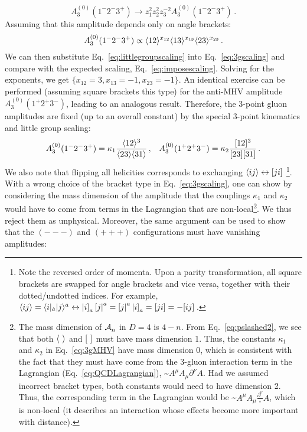 \documentclass[main.tex]{subfiles}
\begin{document}
\begin{equation} \label{eq:imposescaling}
    A_3^{(0)} (1^-2^-3^+) \rightarrow z_1^2 z_2^2 z_3^{-2} A_3^{(0)}(1^-2^-3^+) \,.
\end{equation}
Assuming that this amplitude depends only on angle brackets:
\begin{equation} \label{eq:3gscaling}
    A_3^{(0)} (1^-2^-3^+) \propto \langle 12 \rangle^{x_{12}} \langle 13 \rangle^{x_{13}} \langle 23 \rangle^{x_{23}} \,.
\end{equation}
We can then substitute Eq.~\ref{eq:littlegroupscaling} into Eq.~\ref{eq:3gscaling} and compare with the expected scaling, Eq.~\ref{eq:imposescaling}. Solving for the exponents, we get $\{x_{12} = 3, x_{13} = -1, x_{23} = -1\}$. An identical exercise can be performed (assuming square brackets this type) for the anti-MHV amplitude $A_3^{(0)} (1^+2^+3^-)$, leading to an analogous result. Therefore, the 3-point gluon amplitudes are fixed (up to an overall constant) by the special 3-point kinematics and little group scaling:
\begin{align} \label{eq:3gMHV}
    A_3^{(0)} (1^-2^-3^+) = \kappa_1 \frac{\langle 12 \rangle^3}{\langle 23 \rangle\langle 31 \rangle}\,, && A_3^{(0)} (1^+2^+3^-) = \kappa_2 \frac{[ 12 ]^3}{[ 23 ][ 31 ]} \,.
\end{align}
We also note that flipping all helicities corresponds to exchanging $\langle ij \rangle \leftrightarrow [ ji ]$ \footnote{Note the reversed order of momenta. Upon a parity transformation, all square brackets are swapped for angle brackets and vice versa, together with their dotted/undotted indices. For example, $\langle ij \rangle = \langle i|_{\dot{a}} |j \rangle^{\dot{a}} \leftrightarrow \left| i \right]_a \left[ j \right|^a = \left[ j \right|^a \left| i \right]_a = [ ji ] = - [ ij ]\,$.}. With a wrong choice of the bracket type in Eq.~\ref{eq:3gscaling}, one can show by considering the mass dimension of the amplitude that the couplings $\kappa_1$ and $\kappa_2$ would have to come from terms in the Lagrangian that are non-local\footnote{The mass dimension of $\mathcal{A}_{n}^{}$ in $D=4$ is $4-n$. From Eq.~\ref{eq:pslashed2}, we see that both $\langle \phantom{i} \rangle$ and $\braketsq$ must have mass dimension 1. Thus, the constants $\kappa_1$ and $\kappa_2$ in Eq.~\ref{eq:3gMHV} have mass dimension 0, which is consistent with the fact that they must have come from the 3-gluon interaction term in the Lagrangian (Eq.~\ref{eq:QCDLagrangian}), \textasciitilde$A^\mu A_\mu \partial^\nu A$. Had we assumed incorrect bracket types, both constants would need to have dimension 2. Thus, the corresponding term in the Lagrangian would be \textasciitilde$A^\mu A_\mu \frac{\partial^\nu}{\square} A$, which is non-local (it describes an interaction whose effects become more important with distance).}. We thus reject them as unphysical. Moreover, the same argument can be used to show that the $(---)$ and $(+++)$ configurations must have vanishing amplitudes:
\end{document}

